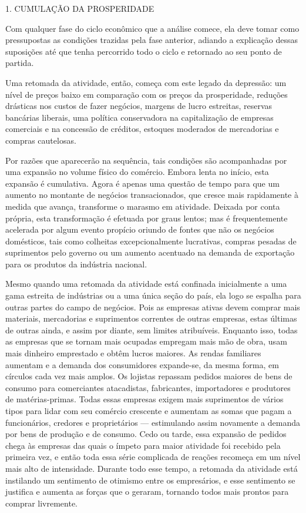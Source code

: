 \documentclass[12pt]{article}
\begin{document}
1. CUMULAÇÃO DA PROSPERIDADE

Com qualquer fase do ciclo econômico que a análise comece, ela deve tomar como pressupostas as condições trazidas pela fase anterior, adiando a explicação dessas suposições até que tenha percorrido todo o ciclo e retornado ao seu ponto de partida.

Uma retomada da atividade, então, começa com este legado da depressão: um nível de preços baixo em comparação com os preços da prosperidade, reduções drásticas nos custos de fazer negócios, margens de lucro estreitas, reservas bancárias liberais, uma política conservadora na capitalização de empresas comerciais e na concessão de créditos, estoques moderados de mercadorias e compras cautelosas.

Por razões que aparecerão na sequência, tais condições são acompanhadas por uma expansão no volume físico do comércio. Embora lenta no início, esta expansão é cumulativa. Agora é apenas uma questão de tempo para que um aumento no montante de negócios transacionados, que cresce mais rapidamente à medida que avança, transforme o marasmo em atividade. Deixada por conta própria, esta transformação é efetuada por graus lentos; mas é frequentemente acelerada por algum evento propício oriundo de fontes que não os negócios domésticos, tais como colheitas excepcionalmente lucrativas, compras pesadas de suprimentos pelo governo ou um aumento acentuado na demanda de exportação para os produtos da indústria nacional.

Mesmo quando uma retomada da atividade está confinada inicialmente a uma gama estreita de indústrias ou a uma única seção do país, ela logo se espalha para outras partes do campo de negócios. Pois as empresas ativas devem comprar mais materiais, mercadorias e suprimentos correntes de outras empresas, estas últimas de outras ainda, e assim por diante, sem limites atribuíveis. Enquanto isso, todas as empresas que se tornam mais ocupadas empregam mais mão de obra, usam mais dinheiro emprestado e obtêm lucros maiores. As rendas familiares aumentam e a demanda dos consumidores expande-se, da mesma forma, em círculos cada vez mais amplos. Os lojistas repassam pedidos maiores de bens de consumo para comerciantes atacadistas, fabricantes, importadores e produtores de matérias-primas. Todas essas empresas exigem mais suprimentos de vários tipos para lidar com seu comércio crescente e aumentam as somas que pagam a funcionários, credores e proprietários — estimulando assim novamente a demanda por bens de produção e de consumo. Cedo ou tarde, essa expansão de pedidos chega às empresas das quais o ímpeto para maior atividade foi recebido pela primeira vez, e então toda essa série complicada de reações recomeça em um nível mais alto de intensidade. Durante todo esse tempo, a retomada da atividade está instilando um sentimento de otimismo entre os empresários, e esse sentimento se justifica e aumenta as forças que o geraram, tornando todos mais prontos para comprar livremente.
\end{document}
